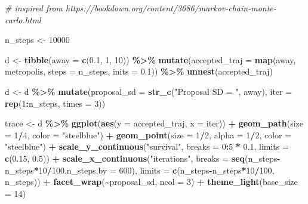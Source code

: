 \documentclass[
  12pt,
]{krantz}
\newenvironment{Shaded}{\begin{snugshade}}{\end{snugshade}}
\newcommand{\AttributeTok}[1]{\textcolor[rgb]{0.13,0.29,0.53}{#1}}
\newcommand{\CommentTok}[1]{\textcolor[rgb]{0.56,0.35,0.01}{\textit{#1}}}
\newcommand{\DecValTok}[1]{\textcolor[rgb]{0.00,0.00,0.81}{#1}}
\newcommand{\FloatTok}[1]{\textcolor[rgb]{0.00,0.00,0.81}{#1}}
\newcommand{\FunctionTok}[1]{\textcolor[rgb]{0.13,0.29,0.53}{\textbf{#1}}}
\newcommand{\NormalTok}[1]{#1}
\newcommand{\OtherTok}[1]{\textcolor[rgb]{0.56,0.35,0.01}{#1}}
\newcommand{\SpecialCharTok}[1]{\textcolor[rgb]{0.81,0.36,0.00}{\textbf{#1}}}
\newcommand{\StringTok}[1]{\textcolor[rgb]{0.31,0.60,0.02}{#1}}
\begin{document}
\begin{Shaded}
\begin{Highlighting}[]
\CommentTok{\# inspired from https://bookdown.org/content/3686/markov{-}chain{-}monte{-}carlo.html}

\NormalTok{n\_steps }\OtherTok{\textless{}{-}} \DecValTok{10000}

\NormalTok{d }\OtherTok{\textless{}{-}}
  \FunctionTok{tibble}\NormalTok{(}\AttributeTok{away =} \FunctionTok{c}\NormalTok{(}\FloatTok{0.1}\NormalTok{, }\DecValTok{1}\NormalTok{, }\DecValTok{10}\NormalTok{)) }\SpecialCharTok{\%\textgreater{}\%} 
  \FunctionTok{mutate}\NormalTok{(}\AttributeTok{accepted\_traj =} \FunctionTok{map}\NormalTok{(away, metropolis, }\AttributeTok{steps =}\NormalTok{ n\_steps, }\AttributeTok{inits =} \FloatTok{0.1}\NormalTok{)) }\SpecialCharTok{\%\textgreater{}\%} 
  \FunctionTok{unnest}\NormalTok{(accepted\_traj)}

\NormalTok{d }\OtherTok{\textless{}{-}}
\NormalTok{  d }\SpecialCharTok{\%\textgreater{}\%} 
  \FunctionTok{mutate}\NormalTok{(}\AttributeTok{proposal\_sd =} \FunctionTok{str\_c}\NormalTok{(}\StringTok{"Proposal SD = "}\NormalTok{, away),}
         \AttributeTok{iter        =} \FunctionTok{rep}\NormalTok{(}\DecValTok{1}\SpecialCharTok{:}\NormalTok{n\_steps, }\AttributeTok{times =} \DecValTok{3}\NormalTok{))}

\NormalTok{trace }\OtherTok{\textless{}{-}}\NormalTok{ d }\SpecialCharTok{\%\textgreater{}\%} 
  \FunctionTok{ggplot}\NormalTok{(}\FunctionTok{aes}\NormalTok{(}\AttributeTok{y =}\NormalTok{ accepted\_traj, }\AttributeTok{x =}\NormalTok{ iter)) }\SpecialCharTok{+}
  \FunctionTok{geom\_path}\NormalTok{(}\AttributeTok{size =} \DecValTok{1}\SpecialCharTok{/}\DecValTok{4}\NormalTok{, }\AttributeTok{color =} \StringTok{"steelblue"}\NormalTok{) }\SpecialCharTok{+}
  \FunctionTok{geom\_point}\NormalTok{(}\AttributeTok{size =} \DecValTok{1}\SpecialCharTok{/}\DecValTok{2}\NormalTok{, }\AttributeTok{alpha =} \DecValTok{1}\SpecialCharTok{/}\DecValTok{2}\NormalTok{, }\AttributeTok{color =} \StringTok{"steelblue"}\NormalTok{) }\SpecialCharTok{+}
  \FunctionTok{scale\_y\_continuous}\NormalTok{(}\StringTok{"survival"}\NormalTok{, }\AttributeTok{breaks =} \DecValTok{0}\SpecialCharTok{:}\DecValTok{5} \SpecialCharTok{*} \FloatTok{0.1}\NormalTok{, }\AttributeTok{limits =} \FunctionTok{c}\NormalTok{(}\FloatTok{0.15}\NormalTok{, }\FloatTok{0.5}\NormalTok{)) }\SpecialCharTok{+}
  \FunctionTok{scale\_x\_continuous}\NormalTok{(}\StringTok{"iterations"}\NormalTok{, }
                     \AttributeTok{breaks =} \FunctionTok{seq}\NormalTok{(n\_steps}\SpecialCharTok{{-}}\NormalTok{n\_steps}\SpecialCharTok{*}\DecValTok{10}\SpecialCharTok{/}\DecValTok{100}\NormalTok{,n\_steps,}\AttributeTok{by =} \DecValTok{600}\NormalTok{), }
                     \AttributeTok{limits =} \FunctionTok{c}\NormalTok{(n\_steps}\SpecialCharTok{{-}}\NormalTok{n\_steps}\SpecialCharTok{*}\DecValTok{10}\SpecialCharTok{/}\DecValTok{100}\NormalTok{, n\_steps)) }\SpecialCharTok{+}
  \FunctionTok{facet\_wrap}\NormalTok{(}\SpecialCharTok{\textasciitilde{}}\NormalTok{proposal\_sd, }\AttributeTok{ncol =} \DecValTok{3}\NormalTok{) }\SpecialCharTok{+}
  \FunctionTok{theme\_light}\NormalTok{(}\AttributeTok{base\_size =} \DecValTok{14}\NormalTok{)}


\end{Highlighting}
\end{Shaded}
\end{document}
